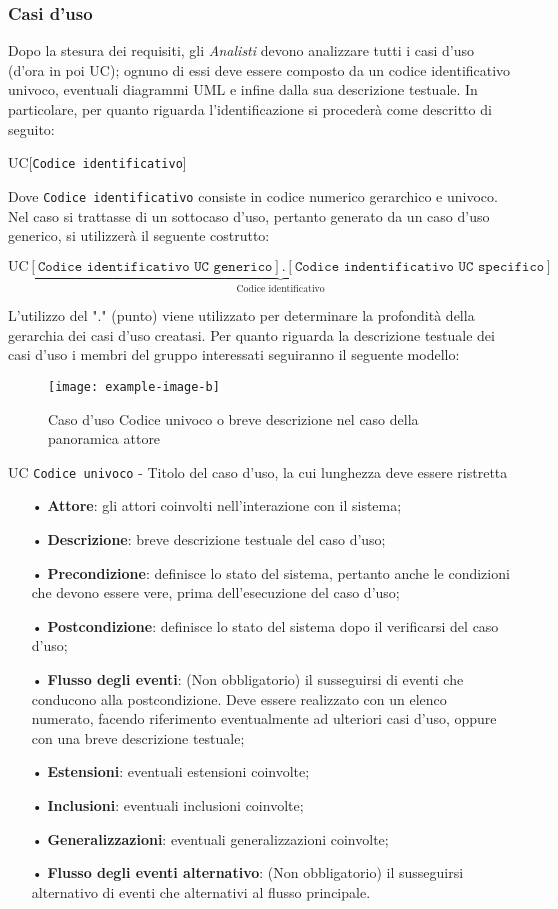\subsubsection{Casi d'uso}
Dopo la stesura dei requisiti, gli \textit{Analisti} devono analizzare tutti i casi d'uso (d'ora in poi UC); ognuno di essi deve essere composto da un codice identificativo univoco, eventuali diagrammi UML e infine dalla sua descrizione testuale. In particolare, per quanto riguarda l'identificazione si procederà come descritto di seguito:
\begin{center}
UC[\texttt{Codice identificativo}]
\end{center}
Dove \texttt{Codice identificativo} consiste in codice numerico {gerarchico} e univoco.
Nel caso si trattasse di un {sottocaso d'uso}, pertanto generato da un caso d'uso generico, si utilizzerà il seguente costrutto:
\begin{center}
$\text{UC}\underbrace{[\texttt{Codice identificativo UC generico}].[\texttt{Codice indentificativo UC specifico}]}_{\text{Codice   identificativo}}$
\end{center}
L'utilizzo del "." (punto) viene utilizzato per determinare la profondità della gerarchia dei casi d'uso creatasi.
Per quanto riguarda la descrizione testuale dei casi d'uso i membri del gruppo interessati seguiranno il seguente modello:
\begin{figure}[H]
\centering
\texttt{[image: example-image-b]}
\caption{Caso d'uso Codice univoco o breve descrizione nel caso della panoramica attore}
\end{figure}
UC \texttt{Codice univoco} - Titolo del caso d'uso, la cui lunghezza deve essere ristretta
\begin{itemize}
\item[•] \textbf{Attore}: gli attori coinvolti nell'interazione con il sistema;
\item[•] \textbf{Descrizione}: breve descrizione testuale del caso d'uso;
\item[•] \textbf{Precondizione}: definisce lo stato del sistema, pertanto anche le condizioni che devono essere vere, prima dell'esecuzione del caso d'uso; 
\item[•] \textbf{Postcondizione}: definisce lo stato del sistema dopo il verificarsi del caso d'uso; 
\item[•] \textbf{Flusso degli eventi}: (Non obbligatorio) il susseguirsi di eventi che conducono alla postcondizione. Deve essere realizzato con un elenco numerato, facendo riferimento eventualmente ad ulteriori casi d'uso, oppure con una breve descrizione testuale;
\item[•] \textbf{Estensioni}: eventuali estensioni coinvolte;
\item[•] \textbf{Inclusioni}: eventuali inclusioni coinvolte;
\item[•] \textbf{Generalizzazioni}: eventuali generalizzazioni coinvolte;
\item[•] \textbf{Flusso degli eventi alternativo}: (Non obbligatorio) il susseguirsi alternativo di eventi che alternativi al flusso principale.
\end{itemize}



